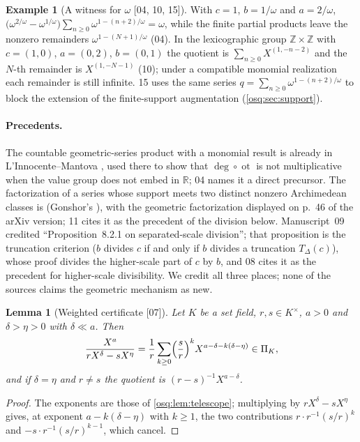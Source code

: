 \documentclass[11pt,letterpaper]{article}
\numberwithin{equation}{section}
\newtheorem{lemma}[lemma]{Lemma}
\theoremstyle{definition}
\newtheorem{example}[example]{Example}
\theoremstyle{remark}
\theoremstyle{plain}
\newcommand{\Z}{\mathbb Z}
\newcommand{\R}{\mathbb R}
\newcommand{\src}[1]{\textup{\textsf{[#1]}}}
\begin{document}
\begin{example}[A witness for $\omega$ \src{04, 10, 15}]\label{osq:ex:omegatelescope}
With $c=1$, $b=1/\omega$ and $a=2/\omega$,
$\bigl(\omega^{2/\omega}-\omega^{1/\omega}\bigr)\sum_{n\ge0}\omega^{1-(n+2)/\omega}=\omega$,
while the finite partial products leave the nonzero remainders
$\omega^{1-(N+1)/\omega}$ (04). In the lexicographic group $\Z\times\Z$ with $c=(1,0)$,
$a=(0,2)$, $b=(0,1)$ the quotient is $\sum_{n\ge0}X^{(1,-n-2)}$ and the $N$-th remainder is
$X^{(1,-N-1)}$ (10); under a compatible monomial realization each remainder is still
infinite. 15 uses the same series $q=\sum_{n\ge0}\omega^{1-(n+2)/\omega}$ to block the extension of the
finite-support augmentation (\cref{osq:sec:support}).
\end{example}

\paragraph{Precedents.} The countable geometric-series product with a monomial result is
already in L'Innocente--Mantova \cite[Remark~3.4.4]{LM}, used there to show that
$\deg\circ\operatorname{ot}$ is not multiplicative when the value group does not embed in
$\R$; 04 names it a direct precursor. The factorization of a series whose support meets two
distinct nonzero Archimedean classes is \cite[Fact~8.0.1]{LM} (Gonshor's
\cite[Thm.~8.6]{Gonshor}), with the geometric factorization displayed on p.~46 of the arXiv
version; 11 cites it as the precedent of the division below. Manuscript~09 credited
``Proposition~8.2.1 on separated-scale division''; that proposition is the truncation
criterion ($b$ divides $c$ if and only if $b$ divides a truncation $T_\Delta(c)$), whose
proof divides the higher-scale part of $c$ by $b$, and 08 cites it as the precedent for
higher-scale divisibility. We credit all three places; none of the sources claims the
geometric mechanism as new.

\begin{lemma}[Weighted certificate \src{07}]\label{osq:lem:weighted}
Let $K$ be a set field, $r,s\in K^\times$, $a>0$ and $\delta>\eta>0$ with $\delta\ll a$.
Then
\begin{equation}\label{osq:eq:weighted}
 \frac{X^a}{rX^\delta-sX^\eta}
 =\frac1r\sum_{k\ge0}\Bigl(\frac sr\Bigr)^kX^{a-\delta-k(\delta-\eta)}\in\Pi_K ,
\end{equation}
and if $\delta=\eta$ and $r\ne s$ the quotient is $(r-s)^{-1}X^{a-\delta}$.
\end{lemma}
\begin{proof}
The exponents are those of \cref{osq:lem:telescope}; multiplying by $rX^\delta-sX^\eta$
gives, at exponent $a-k(\delta-\eta)$ with $k\ge1$, the two contributions
$r\cdot r^{-1}(s/r)^k$ and $-s\cdot r^{-1}(s/r)^{k-1}$, which cancel.
\end{proof}
\end{document}
